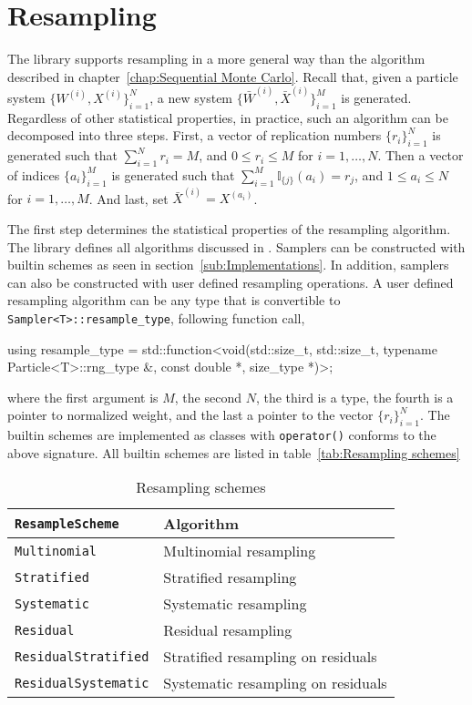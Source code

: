\chapter{Resampling}
\label{chap:Resampling}

The library supports resampling in a more general way than the algorithm
described in chapter~\ref{chap:Sequential Monte Carlo}. Recall that, given a
particle system $\{W^{(i)},X^{(i)}\}_{i=1}^N$, a new system $\{\bar{W}^{(i)},
\bar{X}^{(i)}\}_{i=1}^M$ is generated. Regardless of other statistical
properties, in practice, such an algorithm can be decomposed into three steps.
First, a vector of replication numbers $\{r_i\}_{i=1}^N$ is generated such that
$\sum_{i=1}^N r_i = M$, and $0 \le r_i \le M$ for $i=1,\dots,N$. Then a vector
of indices $\{a_i\}_{i=1}^M$ is generated such that $\sum_{i=1}^M
\mathbb{I}_{\{j\}}(a_i) = r_j$, and $1 \le a_i \le N$ for $i= 1,\dots,M$. And
last, set $\bar{X}^{(i)} = X^{(a_i)}$.

The first step determines the statistical properties of the resampling
algorithm. The library defines all algorithms discussed in
\textcite{Douc:2005wa}. Samplers can be constructed with builtin schemes as
seen in section~\ref{sub:Implementations}. In addition, samplers can also be
constructed with user defined resampling operations. A user defined resampling
algorithm can be any type that is convertible to
\verb|Sampler<T>::resample_type|,
following function call,
\begin{cppcode}
  using resample_type = std::function<void(std::size_t, std::size_t,
      typename Particle<T>::rng_type &, const double *, size_type *)>;
\end{cppcode}
where the first argument is $M$, the second $N$, the third is a \cppoo{} \rng
type, the fourth is a pointer to normalized weight, and the last a pointer to
the vector $\{r_i\}_{i=1}^N$. The builtin schemes are implemented as classes
with \verb|operator()| conforms to the above signature. All builtin schemes are
listed in table~\ref{tab:Resampling schemes}

\begin{table}
  \begin{tabularx}{\textwidth}{lX}
    \toprule
    \verb|ResampleScheme| & Algorithm \\
    \midrule
    \verb|Multinomial|        & Multinomial resampling             \\
    \verb|Stratified|         & Stratified resampling              \\
    \verb|Systematic|         & Systematic resampling              \\
    \verb|Residual|           & Residual resampling                \\
    \verb|ResidualStratified| & Stratified resampling on residuals \\
    \verb|ResidualSystematic| & Systematic resampling on residuals \\
    \bottomrule
  \end{tabularx}
  \caption{Resampling schemes}
  \label{lab:Resampling schemes}
\end{table}

